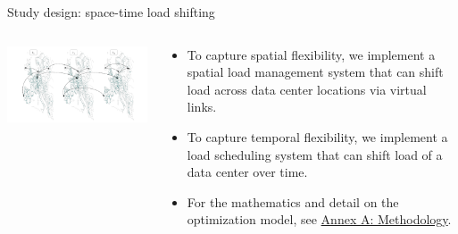 \begin{frame}{Study design: space-time load shifting}

  {\footnotesize
  \begin{columns}[T]
  
  \hspace{-1.5cm}
  \begin{column}{10cm}
  \vspace{0.3cm}
  \includegraphics[width=11.5cm]{images/spatial-temporal-vlinks.png}
  \end{column}

  \begin{column}{6cm}
  \begin{itemize}
    \vspace{0.3cm}
    \item To capture spatial flexibility, we implement a spatial load management system that can shift load across data center locations via virtual links.
    \item To capture temporal flexibility, we implement a load scheduling system that can shift load of a data center over time.
    \item For the mathematics and detail on the optimization model, see \alert{\hyperlink{methodology}{Annex A: Methodology}}.
  \end{itemize}

  \end{column}
  \end{columns}
  }
\end{frame}


